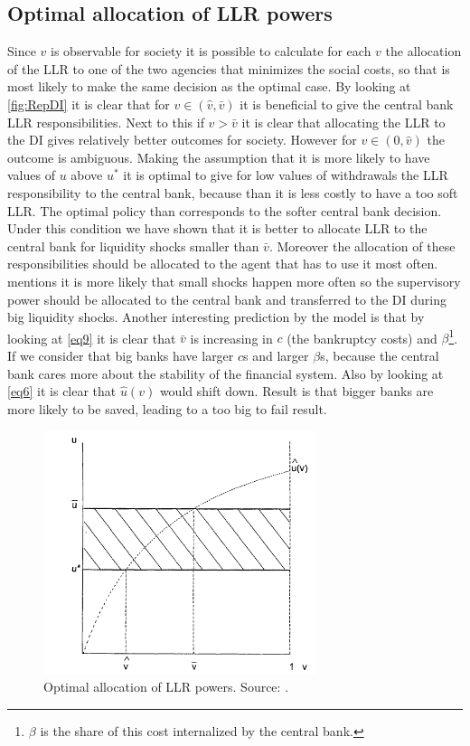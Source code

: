 \documentclass[twoside, 12pt]{article}
\numberwithin{equation}{section}
\begin{document}
\subsection{Optimal allocation of LLR powers}
Since $v$ is observable for society it is possible to calculate for each $v$ the allocation of the LLR to one of the two agencies that minimizes the social costs, so that is most likely to make the same decision as the optimal case. By looking at \autoref{fig:RepDI} it is clear that for $v \in(\hat{v},\bar{v})$ it is beneficial to give the central bank LLR responsibilities. Next to this if $v>\bar{v}$ it is clear that allocating the LLR to the DI gives relatively better outcomes for society. However for $v\in(0,\hat{v})$ the outcome is ambiguous. Making the assumption that it is more likely to have values of $u$ above $u^*$ it is optimal to give for low values of withdrawals the LLR responsibility to the central bank, because than it is less costly to have a too soft LLR. The optimal policy than corresponds to the softer central bank decision. Under this condition we have shown that it is better to allocate LLR to the central bank for liquidity shocks smaller than $\bar{v}$. Moreover the allocation of these responsibilities should be allocated to the agent that has to use it most often.  mentions it is more likely that small shocks happen more often so the supervisory power should be allocated to the central bank and transferred to the DI during big liquidity shocks. Another interesting prediction by the model is that by looking at \eqref{eq9} it is clear that $\bar{v}$ is increasing in $c$ (the bankruptcy costs) and $\beta$\footnote{$\beta$ is the share of this cost internalized by the central bank.}. If we consider that big banks have larger $c$s and larger $\beta$s, because the central bank cares more about the stability of the financial system. Also by looking at \eqref{eq6} it is clear that $\hat{u}(v)$ would shift down. Result is that bigger banks are more likely to be saved, leading to a too big to fail result.

\begin{figure}[htbp]
\begin{centering}
\includegraphics[width=8cm]{Repullo2000DI.png}
\caption{Optimal allocation of LLR powers. Source: \protect\cite{repullo2000}.}
\label{fig:RepDI}
\end{centering}
\end{figure}
\end{document}
